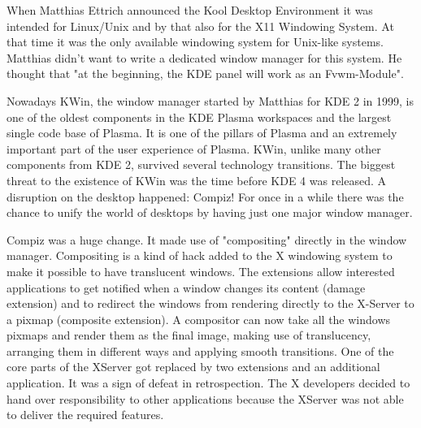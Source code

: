 
\noindent{}When Matthias Ettrich announced the Kool Desktop Environment it was intended for Linux/Unix and by that also for the X11 Windowing System. At that time it was the only available windowing system for Unix-like systems. Matthias didn't want to write a dedicated window manager for this system. He thought that "at the beginning, the KDE panel will work as an Fvwm-Module".

Nowadays KWin, the window manager started by Matthias for KDE 2 in 1999, is one of the oldest components in the KDE Plasma workspaces and the largest single code base of Plasma. It is one of the pillars of Plasma and an extremely important part of the user experience of Plasma. KWin, unlike many other components from KDE 2, survived several technology transitions. The biggest threat to the existence of KWin was the time before KDE 4 was released. A disruption on the desktop happened: Compiz! For once in a while there was the chance to unify the world of desktops by having just one major window manager.

Compiz was a huge change. It made use of "compositing" directly in the window manager. Compositing is a kind of hack added to the X windowing system to make it possible to have translucent windows. The extensions allow interested applications to get notified when a window changes its content (damage extension) and to redirect the windows from rendering directly to the X-Server to a pixmap (composite extension). A compositor can now take all the windows pixmaps and render them as the final image, making use of translucency, arranging them in different ways and applying smooth transitions. One of the core parts of the XServer got replaced by two extensions and an additional application. It was a sign of defeat in retrospection. The X developers decided to hand over responsibility to other applications because the XServer was not able to deliver the required features.

